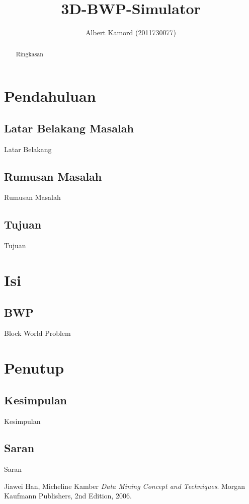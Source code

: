 \documentclass[11pt,a4paper]{report}
\author{Albert Kamord (2011730077)}
\title{3D-BWP-Simulator}
\begin{document}
\maketitle
\begin{abstract}

\indent Ringkasan \\
\end{abstract}

\tableofcontents \newpage 	%
\listoffigures \newpage 	%


\chapter{Pendahuluan} %
\section{Latar Belakang Masalah}
Latar Belakang

\section{Rumusan Masalah}
Rumusan Masalah

\section{Tujuan}
Tujuan


\chapter{Isi} %
\section{BWP}
Block World Problem


\chapter{Penutup} %
\section{Kesimpulan}
Kesimpulan
\section{Saran}
Saran

\begin{thebibliography}{9}

  Jiawei Han, Micheline Kamber
  \emph{Data Mining Concept and Techniques}.
  Morgan Kaufmann Publishers,
  2nd Edition,
  2006.

\end{thebibliography}
\end{document}

